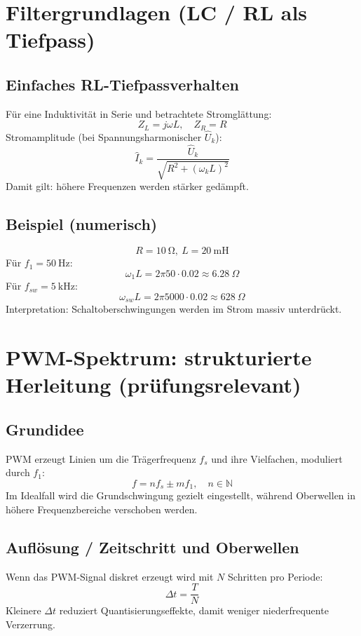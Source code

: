 \documentclass[a4paper,11pt]{article}
\begin{document}
\section{Filtergrundlagen (LC / RL als Tiefpass)}

\subsection{Einfaches RL-Tiefpassverhalten}
Für eine Induktivität in Serie und betrachtete Stromglättung:
\[
Z_L=j\omega L,\quad Z_R=R
\]
Stromamplitude (bei Spannungsharmonischer $\hat{U}_k$):
\[
\hat{I}_k=\frac{\hat{U}_k}{\sqrt{R^2+(\omega_k L)^2}}
\]
Damit gilt: höhere Frequenzen werden stärker gedämpft.

\subsection*{Beispiel (numerisch)}
\[
R=\SI{10}{\ohm},\ L=\SI{20}{\milli\henry}
\]
Für $f_1=\SI{50}{\hertz}$:
\[
\omega_1 L = 2\pi 50\cdot 0.02 \approx 6.28\ \Omega
\]
Für $f_{sw}=\SI{5}{\kilo\hertz}$:
\[
\omega_{sw}L = 2\pi 5000\cdot 0.02 \approx 628\ \Omega
\]
Interpretation: Schaltoberschwingungen werden im Strom massiv unterdrückt.

\section{PWM-Spektrum: strukturierte Herleitung (prüfungsrelevant)}

\subsection{Grundidee}
PWM erzeugt Linien um die Trägerfrequenz $f_s$ und ihre Vielfachen, moduliert durch $f_1$:
\[
f = n f_s \pm m f_1,\quad n\in\mathbb{N}
\]
Im Idealfall wird die Grundschwingung gezielt eingestellt, während Oberwellen in höhere Frequenzbereiche verschoben werden.

\subsection{Auflösung / Zeitschritt und Oberwellen}
Wenn das PWM-Signal diskret erzeugt wird mit $N$ Schritten pro Periode:
\[
\Delta t = \frac{T}{N}
\]
Kleinere $\Delta t$ reduziert Quantisierungseffekte, damit weniger niederfrequente Verzerrung.
\end{document}
